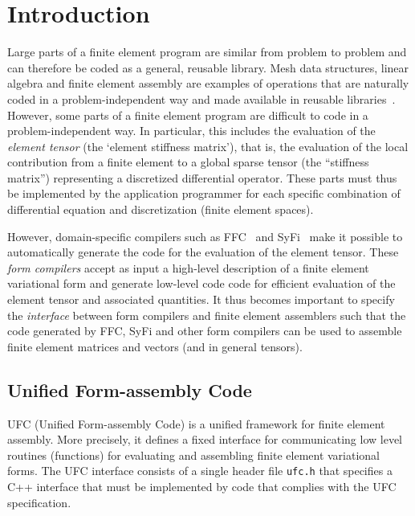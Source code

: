 \chapter{Introduction}
\label{sec:introduction}

Large parts of a finite element program are similar from problem to
problem and can therefore be coded as a general, reusable library.
Mesh data structures, linear algebra and finite element assembly are
examples of operations that are naturally coded in a
problem-independent way and made available in reusable
libraries~\cite{www:fenics,www:petsc,www:sundance,www:deal.II,www:trilinos,www:diffpack}.
However, some parts of a finite element program are difficult to code
in a problem-independent way. In particular, this includes the
evaluation of the \emph{element tensor} (the `element stiffness
matrix'), that is, the evaluation of the local contribution from a
finite element to a global sparse tensor (the ``stiffness matrix'')
representing a discretized differential operator. These parts must
thus be implemented by the application programmer for each specific
combination of differential equation and discretization (finite
element spaces).

   However,
domain-specific compilers such as
FFC~\cite{www:ffc,logg:article:07,logg:article:09,logg:article:10,logg:article:11}
and SyFi~\cite{www:syfi} make it possible to automatically generate
the code for the evaluation of the element tensor. These \emph{form
compilers} accept as input a high-level description of a finite
element variational form and generate low-level code code for
efficient evaluation of the element tensor and associated quantities.
It thus becomes important to specify the \emph{interface} between form
compilers and finite element assemblers such that the code generated
by FFC, SyFi and other form compilers can be used to assemble finite
element matrices and vectors (and in general tensors).

\section{Unified Form-assembly Code}

UFC (Unified Form-assembly Code) is a unified framework for finite
element assembly. More precisely, it defines a fixed interface for
communicating low level routines (functions) for evaluating and
assembling finite element variational forms. The UFC interface
consists of a single header file \texttt{ufc.h} that specifies a C++
interface that must be implemented by code that complies with the UFC
specification.

